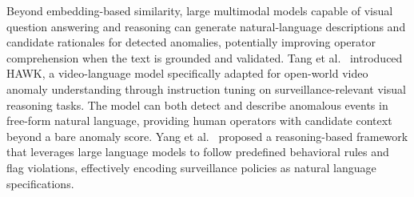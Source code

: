 \documentclass[10pt,a4paper]{article}
\begin{document}
Beyond embedding-based similarity, large multimodal models capable of visual question answering and reasoning can generate natural-language descriptions and candidate rationales for detected anomalies, potentially improving operator comprehension when the text is grounded and validated. Tang et al.~\citeyearpar{tang2024hawk} introduced HAWK, a video-language model specifically adapted for open-world video anomaly understanding through instruction tuning on surveillance-relevant visual reasoning tasks. The model can both detect and describe anomalous events in free-form natural language, providing human operators with candidate context beyond a bare anomaly score. Yang et al.~\citeyearpar{yang2024follow} proposed a reasoning-based framework that leverages large language models to follow predefined behavioral rules and flag violations, effectively encoding surveillance policies as natural language specifications.
\end{document}
